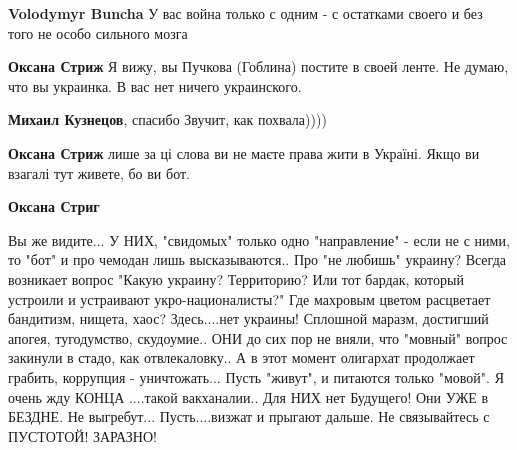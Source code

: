\begin{itemize}
\begin{itemize}
 
\textbf{Volodymyr Buncha} У вас война только с одним - с остатками своего и без того не особо сильного мозга

 
\textbf{Оксана Стриж} Я вижу, вы Пучкова (Гоблина) постите в своей ленте. Не думаю, что вы украинка. В вас нет ничего украинского.

 
\textbf{Михаил Кузнецов}, спасибо \Smiley[1.0][yellow] Звучит, как похвала))))

 
\textbf{Оксана Стриж} лише за ці слова ви не маєте права жити в Україні. Якщо ви взагалі тут живете, бо ви бот.

 
\textbf{Оксана Стриг}

\obeycr
Вы же видите...
У НИХ, "свидомых" только одно "направление" - если не с ними, то "бот" и про чемодан лишь высказываются..
Про "не любишь" украину?
Всегда возникает вопрос "Какую украину? Территорию? Или тот бардак, который устроили и устраивают укро-националисты?"
Где махровым цветом расцветает бандитизм, нищета, хаос?
Здесь....нет украины!
Сплошной маразм, достигший апогея, тугодумство, скудоумие..
ОНИ до сих пор не вняли, что "мовный" вопрос закинули в стадо, как отвлекаловку..
А в этот момент олигархат продолжает грабить, коррупция - уничтожать...
Пусть "живут", и питаются только "мовой".
Я очень жду КОНЦА ....такой вакханалии..
Для НИХ нет Будущего!
Они УЖЕ в БЕЗДНЕ.
Не выгребут...
Пусть....визжат и прыгают дальше.
Не связывайтесь с ПУСТОТОЙ!
ЗАРАЗНО!
\restorecr

\end{itemize}

 

\end{itemize}
